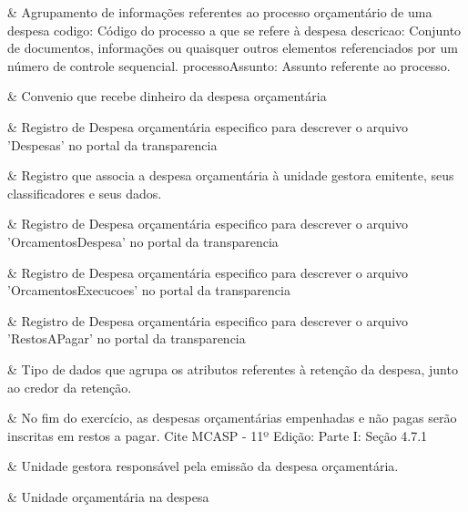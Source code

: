  &
Agrupamento de informações referentes ao processo orçamentário de uma despesa codigo: Código do processo a que se refere à despesa descricao: Conjunto de documentos, informações ou quaisquer outros elementos referenciados por um número de controle sequencial. processoAssunto: Assunto referente ao processo. 
\\ \hline

 &
Convenio que recebe dinheiro da despesa orçamentária 
\\ \hline

 &
Registro de Despesa orçamentária especifico para descrever o arquivo 'Despesas' no portal da transparencia 
\\ \hline

 &
Registro que associa a despesa orçamentária à unidade gestora emitente, seus classificadores e seus dados. 
\\ \hline

 &
Registro de Despesa orçamentária especifico para descrever o arquivo 'OrcamentosDespesa' no portal da transparencia 
\\ \hline

 &
Registro de Despesa orçamentária especifico para descrever o arquivo 'OrcamentosExecucoes' no portal da transparencia 
\\ \hline

 &
Registro de Despesa orçamentária especifico para descrever o arquivo 'RestosAPagar' no portal da transparencia 
\\ \hline

 &
Tipo de dados que agrupa os atributos referentes à retenção da despesa, junto ao credor da retenção. 
\\ \hline

 &
No fim do exercício, as despesas orçamentárias empenhadas e não pagas serão inscritas em restos a pagar. Cite MCASP - 11º Edição: Parte I: Seção 4.7.1 
\\ \hline

 &
Unidade gestora responsável pela emissão da despesa orçamentária. 
\\ \hline

 &
Unidade orçamentária na despesa 
\\ \hline

